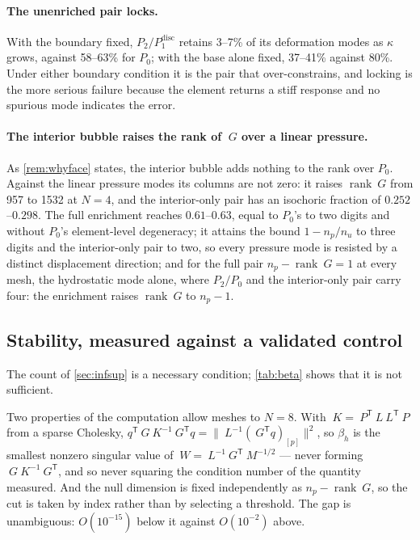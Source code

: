 \documentclass{article}
\newcommand{\transpose}[1]{#1^{\mathsf{T}}}
\theoremstyle{definition}
\theoremstyle{plain}
\begin{document}
\paragraph{The unenriched pair locks.} With the boundary fixed,
$P_2/P_1^{\mathrm{disc}}$ retains 3--7\% of its deformation modes as $\kappa$
grows, against 58--63\% for $P_0$; with the base alone fixed, 37--41\%
against 80\%. Under either boundary condition it is the pair that
over-constrains, and locking is the more serious failure because the element
returns a stiff response and no spurious mode indicates the error.

\paragraph{The interior bubble raises the rank of $~G$ over a linear pressure.}
As \cref{rem:whyface} states, the interior bubble adds nothing to the
rank over $P_0$. Against the linear pressure modes its columns
are not zero: it raises $\operatorname{rank}~G$ from 957 to 1532 at $N = 4$,
and the interior-only pair has an isochoric fraction of $0.252$--$0.298$. The
full enrichment reaches $0.61$--$0.63$, equal to $P_0$'s to two digits and
without $P_0$'s element-level degeneracy; it attains the bound $1 - n_p/n_u$
to three digits and the interior-only pair to two, so every pressure mode is
resisted by a distinct displacement direction; and for the full pair $n_p - \operatorname{rank}~G = 1$ at every mesh,
the hydrostatic mode alone, where $P_2/P_0$ and the interior-only pair carry
four: the enrichment raises $\operatorname{rank}~G$ to $n_p - 1$.

\subsection{Stability, measured against a validated control}
\label{sec:beta}

The count of \cref{sec:infsup} is a necessary condition; \cref{tab:beta}
shows that it is not sufficient.

Two properties of the computation allow meshes to $N = 8$. With $~K = \transpose{~P} ~L
\transpose{~L} ~P$ from a sparse Cholesky, $\transpose{q} ~G ~K^{-1}
\transpose{~G} q = \lVert ~L^{-1} (\transpose{~G} q)_{[p]} \rVert^2$, so
$\beta_h$ is the smallest nonzero singular value of $~W = ~L^{-1}
\transpose{~G} ~M^{-1/2}$ --- never forming $~G ~K^{-1} \transpose{~G}$, and so
never squaring the condition number of the quantity measured. And
the null dimension is fixed independently as $n_p - \operatorname{rank}~G$, so
the cut is taken by index rather than by selecting a threshold. The gap is
unambiguous: $O(10^{-15})$ below it against $O(10^{-2})$ above.
\end{document}
